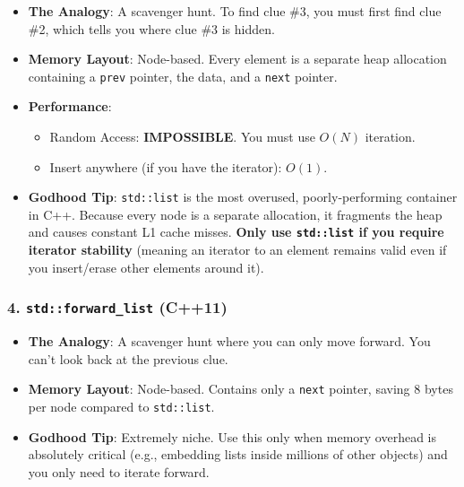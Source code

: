 \begin{itemize}
\tightlist
\item
  \textbf{The Analogy}: A scavenger hunt. To find clue \#3, you must
  first find clue \#2, which tells you where clue \#3 is hidden.
\item
  \textbf{Memory Layout}: Node-based. Every element is a separate heap
  allocation containing a \passthrough{\lstinline!prev!} pointer, the
  data, and a \passthrough{\lstinline!next!} pointer.
\item
  \textbf{Performance}:

  \begin{itemize}
  \tightlist
  \item
    Random Access: \textbf{IMPOSSIBLE}. You must use \(O(N)\) iteration.
  \item
    Insert anywhere (if you have the iterator): \(O(1)\).
  \end{itemize}
\item
  \textbf{Godhood Tip}: \passthrough{\lstinline!std::list!} is the most
  overused, poorly-performing container in C++. Because every node is a
  separate allocation, it fragments the heap and causes constant L1
  cache misses. \textbf{Only use \passthrough{\lstinline!std::list!} if
  you require iterator stability} (meaning an iterator to an element
  remains valid even if you insert/erase other elements around it).
\end{itemize}

\hypertarget{stdforward_list-c11}{%
\subsubsection{\texorpdfstring{4. \texttt{std::forward\_list}
(C++11)}{4. std::forward\_list (C++11)}}\label{stdforward_list-c11}}

\begin{itemize}
\tightlist
\item
  \textbf{The Analogy}: A scavenger hunt where you can only move
  forward. You can't look back at the previous clue.
\item
  \textbf{Memory Layout}: Node-based. Contains only a
  \passthrough{\lstinline!next!} pointer, saving 8 bytes per node
  compared to \passthrough{\lstinline!std::list!}.
\item
  \textbf{Godhood Tip}: Extremely niche. Use this only when memory
  overhead is absolutely critical (e.g., embedding lists inside millions
  of other objects) and you only need to iterate forward.
\end{itemize}

